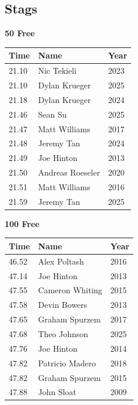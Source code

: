 \subsection{Stags}
\vspace{1.2em}
\noindent\begin{minipage}[t]{0.48\textwidth}
\centering
\textbf{\textcolor{teamprimary}{50 Free}}\par
\vspace{0.5em}
\centering
\small
\renewcommand{\arraystretch}{1.0}
\setlength{\tabcolsep}{4pt}
\begin{tabular}{@{}p{1.8cm}p{3.0cm}p{1.0cm}@{}}
\toprule
\textbf{Time} & \textbf{Name} & \textbf{Year} \\
\midrule
21.10 & Nic Tekieli & 2023 \\
21.10 & Dylan Krueger & 2025 \\
21.18 & Dylan Krueger & 2024 \\
21.46 & Sean Su & 2025 \\
21.47 & Matt Williams & 2017 \\
21.48 & Jeremy Tan & 2024 \\
21.49 & Joe Hinton & 2013 \\
21.50 & Andreas Roeseler & 2020 \\
21.51 & Matt Williams & 2016 \\
21.59 & Jeremy Tan & 2025 \\
\bottomrule
\end{tabular}
\end{minipage}
\hfill
\begin{minipage}[t]{0.48\textwidth}
\centering
\textbf{\textcolor{teamprimary}{100 Free}}\par
\vspace{0.5em}
\centering
\small
\renewcommand{\arraystretch}{1.0}
\setlength{\tabcolsep}{4pt}
\begin{tabular}{@{}p{1.8cm}p{3.0cm}p{1.0cm}@{}}
\toprule
\textbf{Time} & \textbf{Name} & \textbf{Year} \\
\midrule
46.52 & Alex Poltash & 2016 \\
47.14 & Joe Hinton & 2013 \\
47.55 & Cameron Whiting & 2015 \\
47.58 & Devin Bowers & 2013 \\
47.65 & Graham Spurzem & 2017 \\
47.68 & Theo Johnson & 2025 \\
47.76 & Joe Hinton & 2014 \\
47.82 & Patricio Madero & 2018 \\
47.82 & Graham Spurzem & 2015 \\
47.88 & John Sloat & 2009 \\
\bottomrule
\end{tabular}
\end{minipage}
